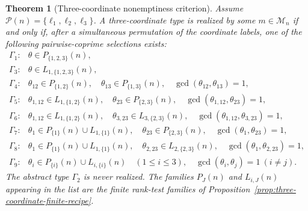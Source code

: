 \documentclass[11pt,letterpaper]{article}
\numberwithin{equation}{section}
\theoremstyle{plain}
\newtheorem{theorem}{Theorem}[section]
\theoremstyle{definition}
\theoremstyle{remark}
\begin{document}
\begin{theorem}[Three-coordinate nonemptiness criterion]
\label{thm:three-coordinate-nonemptiness}
Assume \(\mathcal P(n)=\{\ell_1,\ell_2,\ell_3\}\). A three-coordinate type is
realized by some \(m\in\mathcal M_n\) if and only if, after a simultaneous
permutation of the coordinate labels, one of the following pairwise-coprime
selections exists:
\[
\begin{array}{ll}
\Gamma_1: & \theta\in P_{\{1,2,3\}}(n),\\[1mm]
\Gamma_3: & \theta\in L_{1,\{1,2,3\}}(n),\\[1mm]
\Gamma_4: & \theta_{12}\in P_{\{1,2\}}(n),\quad
             \theta_{13}\in P_{\{1,3\}}(n),\quad
             \gcd(\theta_{12},\theta_{13})=1,\\[1mm]
\Gamma_5: & \theta_{1,12}\in L_{1,\{1,2\}}(n),\quad
             \theta_{23}\in P_{\{2,3\}}(n),\quad
             \gcd(\theta_{1,12},\theta_{23})=1,\\[1mm]
\Gamma_6: & \theta_{1,12}\in L_{1,\{1,2\}}(n),\quad
             \theta_{3,23}\in L_{3,\{2,3\}}(n),\quad
             \gcd(\theta_{1,12},\theta_{3,23})=1,\\[1mm]
\Gamma_7: & \theta_1\in P_{\{1\}}(n)\cup L_{1,\{1\}}(n),\quad
             \theta_{23}\in P_{\{2,3\}}(n),\quad
             \gcd(\theta_1,\theta_{23})=1,\\[1mm]
\Gamma_8: & \theta_1\in P_{\{1\}}(n)\cup L_{1,\{1\}}(n),\quad
             \theta_{2,23}\in L_{2,\{2,3\}}(n),\quad
             \gcd(\theta_1,\theta_{2,23})=1,\\[1mm]
\Gamma_9: & \theta_i\in P_{\{i\}}(n)\cup L_{i,\{i\}}(n)\quad(1\le i\le3),
             \quad \gcd(\theta_i,\theta_j)=1\ (i\ne j).
\end{array}
\]
The abstract type \(\Gamma_2\) is never realized.
The families \(P_J(n)\) and \(L_{i,J}(n)\) appearing in the list are the finite
rank-test families of Proposition~\ref{prop:three-coordinate-finite-recipe}.
\end{theorem}
\end{document}
